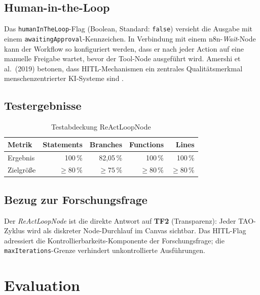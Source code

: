 \documentclass[12pt,a4paper,oneside]{report}
\begin{document}
\section{Human-in-the-Loop}

Das \texttt{humanInTheLoop}-Flag (Boolean, Standard: \texttt{false}) versieht die
Ausgabe mit einem \texttt{awaitingApproval}-Kennzeichen. In Verbindung mit einem
n8n-\textit{Wait}-Node kann der Workflow so konfiguriert werden, dass er nach jeder
Action auf eine manuelle Freigabe wartet, bevor der Tool-Node ausgeführt wird.
Amershi et al.\ (2019) betonen, dass HITL-Mechanismen ein zentrales Qualitätsmerkmal
menschenzentrierter KI-Systeme sind \cite{amershi2019guidelines}.

\section{Testergebnisse}

\begin{table}[H]
  \centering
  \caption{Testabdeckung ReActLoopNode}
  \label{tab:coverage-react}
  \begin{tabular}{lrrrr}
    \toprule
    \textbf{Metrik} & \textbf{Statements} & \textbf{Branches} & \textbf{Functions} & \textbf{Lines} \\
    \midrule
    Ergebnis & 100\,\% & 82,05\,\% & 100\,\% & 100\,\% \\
    Zielgröße & $\geq 80\,\%$ & $\geq 75\,\%$ & $\geq 80\,\%$ & $\geq 80\,\%$ \\
    \bottomrule
  \end{tabular}
\end{table}

\section{Bezug zur Forschungsfrage}

Der \textit{ReActLoopNode} ist die direkte Antwort auf \textbf{TF2} (Transparenz):
Jeder \ac{TAO}-Zyklus wird als diskreter Node-Durchlauf im Canvas sichtbar. Das
HITL-Flag adressiert die Kontrollierbarkeits-Komponente der Forschungsfrage; die
\texttt{maxIterations}-Grenze verhindert unkontrollierte Ausführungen.

\chapter{Evaluation}
\end{document}
